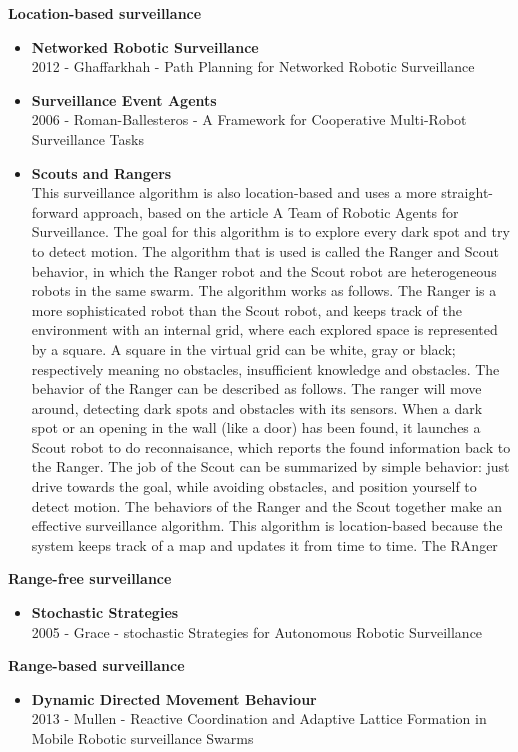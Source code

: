 \textbf{Location-based surveillance}
\begin{itemize}
\item \textbf{Networked Robotic Surveillance}\\

	2012 - Ghaffarkhah - Path Planning for Networked Robotic Surveillance
\item \textbf{Surveillance Event Agents}\\
	2006 - Roman-Ballesteros - A Framework for Cooperative Multi-Robot Surveillance Tasks
\item \textbf{Scouts and Rangers}\\
This surveillance algorithm is also location-based and uses a more straight-forward approach, based on the article A Team of Robotic Agents for Surveillance.  \cite{Rybsky200}
The goal for this algorithm is to explore every dark spot and try to detect motion. 
The algorithm that is used is called the Ranger and Scout behavior, in which the Ranger robot and the Scout robot are heterogeneous robots in the same swarm. 
The algorithm works as follows. The Ranger is a more sophisticated robot than the Scout robot, and keeps track of the environment with an internal grid, where each explored space is represented by a square. 
A square in the virtual grid can be white, gray or black; respectively meaning no obstacles, insufficient knowledge and obstacles. 
The behavior of the Ranger can be described as follows. The ranger will move around, detecting dark spots and obstacles with its sensors.
When a dark spot or an opening in the wall (like a door) has been found, it launches a Scout robot to do reconnaisance, which reports the found information back to the Ranger. 
The job of the Scout can be summarized by simple behavior: just drive towards the goal, while avoiding obstacles, and position yourself to detect motion. 
The behaviors of the Ranger and the Scout together make an effective surveillance algorithm. 
This algorithm is location-based because the system keeps track of a map and updates it from time to time. 
The RAnger
\end{itemize}

\textbf{Range-free surveillance}
\begin{itemize}
\item \textbf{Stochastic Strategies}\\
	2005 - Grace - stochastic Strategies for Autonomous Robotic Surveillance
\end{itemize}

\textbf{Range-based surveillance}
\begin{itemize}
\item \textbf{Dynamic Directed Movement Behaviour}\\
	2013 - Mullen - Reactive Coordination and Adaptive Lattice Formation in Mobile Robotic surveillance Swarms
\end{itemize}

